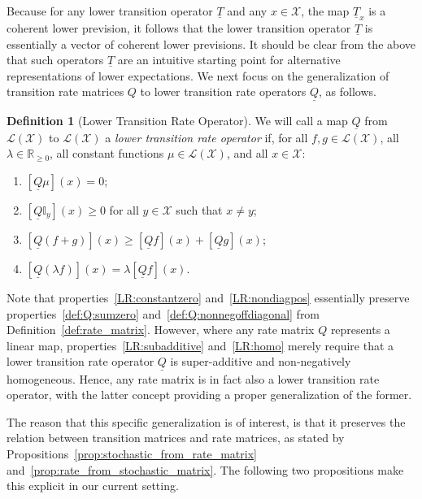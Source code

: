 \documentclass[10pt,a4paper]{paper}
\theoremstyle{definition}
\newtheorem{proposition}[theorem]{Proposition}
\newtheorem{definition}{Definition}
\newcommand{\reals}{\mathbb{R}}
\newcommand{\realsnonneg}{\reals_{\geq 0}}
\newcommand{\states}{\mathcal{X}}
\newcommand{\lt}{\underline{T}}
\newcommand{\gambles}{\mathcal{L}}
\newcommand{\gamblesX}{\gambles(\states)}
\newcommand{\ind}[1]{\mathbb{I}_{#1}}
\newcommand{\lrate}{\underline{Q}}
\newcommand{\norm}[1]{\left\lVert #1 \right\rVert}
\begin{document}
Because for any lower transition operator $\lt$ and any $x\in\states$, the map $\lt_x$ is a coherent lower prevision, it follows that the lower transition operator $\lt$ is essentially a vector of coherent lower previsions. It should be clear from the above that such operators $\lt$ are an intuitive starting point for alternative representations of lower expectations. We next focus on the generalization of transition rate matrices $Q$ to lower transition rate operators $\lrate$, as follows.
\begin{definition}[Lower Transition Rate Operator]\label{def:coh_low_trans_rate}
We will call a map $\lrate$ from $\gamblesX$ to $\gamblesX$ a \emph{lower transition rate operator} if, for all $f,g\in\gamblesX$, all $\lambda\in\realsnonneg$, all constant functions $\mu\in\gamblesX$, and all $x\in\states$:

\begin{enumerate}[label=LR\arabic*:,ref=LR\arabic*]
\item\label{LR:constantzero}
$\left[\lrate\mu\right](x)=0$;
\item\label{LR:nondiagpos}
$\left[\lrate\ind{y}\right](x)\geq0$ for all $y\in\states$ such that $x\neq y$;
\item\label{LR:subadditive}
$\left[\lrate(f+g)\right](x)\geq\left[\lrate f\right](x)+\left[\lrate g\right](x)$;
\item\label{LR:homo}
$\left[\lrate(\lambda f)\right](x)= \lambda\left[\lrate f\right](x)$.
\end{enumerate}
\end{definition}

Note that properties~\ref{LR:constantzero} and~\ref{LR:nondiagpos} essentially preserve properties~\ref{def:Q:sumzero} and~\ref{def:Q:nonnegoffdiagonal} from Definition~\ref{def:rate_matrix}. However, where any rate matrix $Q$ represents a linear map, properties~\ref{LR:subadditive} and~\ref{LR:homo} merely require that a lower transition rate operator $\lrate$ is super-additive and non-negatively homogeneous. Hence, any rate matrix is in fact also a lower transition rate operator, with the latter concept providing a proper generalization of the former.

%
The reason that this specific generalization is of interest, is that it preserves the relation between transition matrices and rate matrices, as stated by Propositions~\ref{prop:stochastic_from_rate_matrix} and~\ref{prop:rate_from_stochastic_matrix}. The following two propositions make this explicit in our current setting.
\end{document}
